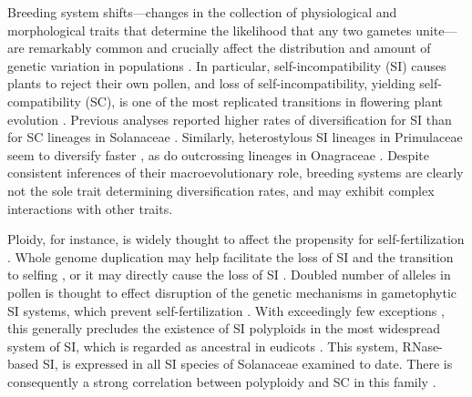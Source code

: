 Breeding system shifts---changes in the collection of physiological and morphological traits that determine the likelihood that any two gametes unite---are remarkably common and crucially affect the distribution and amount of genetic variation in populations \citep{stebbins1974, barrett2013}.
In particular, self-incompatibility (SI) causes plants to reject their own pollen, and loss of self-incompatibility, yielding self-compatibility (SC), is one of the most replicated transitions in flowering plant evolution \citep{stebbins1974,igic_2008}.
Previous analyses reported higher rates of diversification for SI than for SC lineages in Solanaceae \citep{goldberg_2010}. 
Similarly, heterostylous SI lineages in Primulaceae seem to diversify faster \citep{devos2014}, as do outcrossing lineages in Onagraceae \citep{freyman_2018}.
Despite consistent inferences of their macroevolutionary role, breeding systems are clearly not the sole trait determining diversification rates, and may exhibit complex interactions with other traits.

Ploidy, for instance, is widely thought to affect the propensity for self-fertilization \citep{stebbins1950}. 
Whole genome duplication may help facilitate the loss of SI and the transition to selfing \citep{barringer2007, barrett2008, husband2008}, or it may directly cause the loss of SI \citep{stout1942, lewis1947}.
Doubled number of alleles in pollen is thought to effect disruption of the genetic mechanisms in gametophytic SI systems, which prevent self-fertilization \citep{entani1999, tsukamoto2005, kubo2010}. 
With exceedingly few exceptions \citep{hauck_2002,nunes_2006}, this generally precludes the existence of SI polyploids in the most widespread system of SI, which is regarded as ancestral in eudicots \citep{igic_2001,steinbachs_2002}.
This system, RNase-based SI, is expressed in all SI species of Solanaceae examined to date.
There is consequently a strong correlation between polyploidy and SC in this family \citep{robertson_2011}.

